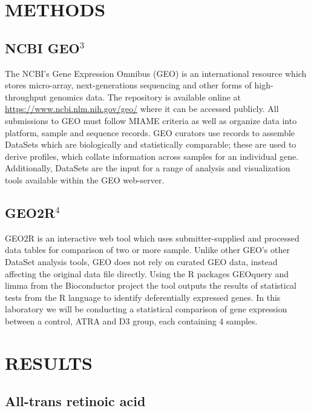 \documentclass[letterpaper, 10 pt, conference]{ieeeconf}  %
\begin{document}
\section{METHODS}

\subsection{NCBI GEO$^3$}

The NCBI's Gene Expression Omnibus (GEO) is an international resource which stores micro-array, next-generations sequencing and other forms of high-throughput genomics data. The repository is available online at 
\url{https://www.ncbi.nlm.nih.gov/geo/} where it can be accessed publicly. All submissions to GEO must follow MIAME criteria as well as organize data into platform, sample and sequence records. GEO curators use records to assemble 
DataSets which are biologically and statistically comparable; these are used to derive profiles, which collate information across samples for an individual gene. Additionally, DataSets are the input for a range of analysis and 
visualization tools available within the GEO web-server.

\subsection{GEO2R$^4$}

GEO2R is an interactive web tool which uses submitter-supplied and processed data tables for comparison of two or more sample. Unlike other GEO's other DataSet analysis tools, GEO does not rely on curated GEO data, instead affecting 
the original data file directly. Using the R packages GEOquery and limma from the Bioconductor project the tool outputs the results of statistical tests from the R language to identify deferentially expressed genes. In this laboratory 
we will be conducting a statistical comparison of gene expression between a control, ATRA and D3 group, each containing 4 samples.

\section{RESULTS}

\subsection{All-trans retinoic acid}

\newcommand{\addpic}[1]{\texttt{[image: \#1]}}
\end{document}
